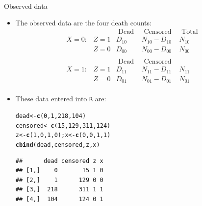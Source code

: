 \documentclass[10pt,handout]{beamer}\usepackage[]{graphicx}\usepackage[]{color}
\makeatletter
\newcommand{\hlnum}[1]{\textcolor[rgb]{0.686,0.059,0.569}{#1}}%
\newcommand{\hlstd}[1]{\textcolor[rgb]{0.345,0.345,0.345}{#1}}%
\newcommand{\hlkwb}[1]{\textcolor[rgb]{0.69,0.353,0.396}{#1}}%
\newcommand{\hlkwd}[1]{\textcolor[rgb]{0.737,0.353,0.396}{\textbf{#1}}}%
\newenvironment{kframe}{%
 \def\at@end@of@kframe{}%
 \ifinner\ifhmode%
  \def\at@end@of@kframe{\end{minipage}}%
  \begin{minipage}{\columnwidth}%
 \fi\fi%
 \def\FrameCommand##1{\hskip\@totalleftmargin \hskip-\fboxsep
 \colorbox{shadecolor}{##1}\hskip-\fboxsep
     \hskip-\linewidth \hskip-\@totalleftmargin \hskip\columnwidth}%
 \MakeFramed {\advance\hsize-\width
   \@totalleftmargin\z@ \linewidth\hsize
   \@setminipage}}%
 {\par\unskip\endMakeFramed%
 \at@end@of@kframe}
\newenvironment{knitrout}{}{} %
\makeatother
\begin{document}
\begin{frame}[fragile]{Observed data}
	\begin{itemize}
		\item The observed data are the four death counts:
		$$
		\begin{array}{llccc} 
		&      & \text { Dead } & \text { Censored } & \text{ Total }\\
		X=0: & Z=1 & D_{10} & N_{10}-D_{10} & N_{10}\\
		& Z=0 & D_{00} & N_{00}-D_{00} & N_{00}\\
		& & & \\
		&  & \text { Dead } & \text { Censored } \\
		X=1:&  Z=1 & D_{11} & N_{11}-D_{11} & N_{11}\\
		&  Z=0    & D_{01} & N_{01}-D_{01} & N_{01}\\
		\end{array}
		$$
		\item These data entered into \texttt{R} are:
\begin{knitrout}\small
{}\color{fgcolor}\begin{kframe}
\begin{alltt}
\hlstd{dead} \hlkwb{<-} \hlkwd{c}\hlstd{(}\hlnum{0}\hlstd{,}\hlnum{1}\hlstd{,}\hlnum{218}\hlstd{,}\hlnum{104}\hlstd{)}
\hlstd{censored} \hlkwb{<-} \hlkwd{c}\hlstd{(}\hlnum{15}\hlstd{,}\hlnum{129}\hlstd{,}\hlnum{311}\hlstd{,}\hlnum{124}\hlstd{)}
\hlstd{z} \hlkwb{<-} \hlkwd{c}\hlstd{(}\hlnum{1}\hlstd{,}\hlnum{0}\hlstd{,}\hlnum{1}\hlstd{,}\hlnum{0}\hlstd{); x} \hlkwb{<-} \hlkwd{c}\hlstd{(}\hlnum{0}\hlstd{,}\hlnum{0}\hlstd{,}\hlnum{1}\hlstd{,}\hlnum{1}\hlstd{)}
\hlkwd{cbind}\hlstd{(dead,censored,z,x)}
\end{alltt}
\begin{verbatim}
##      dead censored z x
## [1,]    0       15 1 0
## [2,]    1      129 0 0
## [3,]  218      311 1 1
## [4,]  104      124 0 1
\end{verbatim}
\end{kframe}
\end{knitrout}
	
	\end{itemize}
\end{frame}
\end{document}
